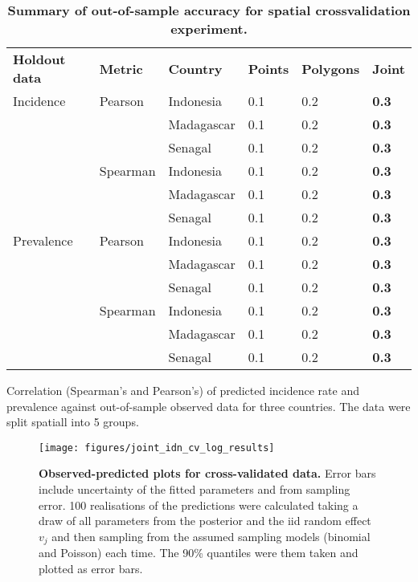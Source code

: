 \documentclass[10pt,letterpaper]{article}
\newlength\savedwidth
\newcommand\thickhline{\noalign{\global\savedwidth\arrayrulewidth\global\arrayrulewidth 2pt}%
\hline
\noalign{\global\arrayrulewidth\savedwidth}}
\begin{document}
\begin{table}[!ht]
\begin{adjustwidth}{-2.25in}{0in} %
\centering
\caption{
{\bf Summary of out-of-sample accuracy for spatial crossvalidation experiment.}}
\begin{tabular}{llllll}
\hline
{\bf Holdout data} & {\bf Metric} & {\bf Country} &  {\bf Points} & {\bf Polygons} & {\bf Joint} \\
\thickhline 
Incidence & Pearson & Indonesia & 0.1 & 0.2 & {\bf 0.3}\\
                   && Madagascar & 0.1 & 0.2 & {\bf 0.3}\\
                   && Senagal & 0.1 & 0.2 & {\bf 0.3}\vspace{1mm}\\ 
          & Spearman & Indonesia & 0.1 & 0.2 & {\bf 0.3}\\
                   && Madagascar & 0.1 & 0.2 & {\bf 0.3}\\
                   && Senagal & 0.1 & 0.2 & {\bf 0.3}\vspace{3mm} \\ 
Prevalence & Pearson & Indonesia & 0.1 & 0.2 & {\bf 0.3}\\
                   && Madagascar & 0.1 & 0.2 & {\bf 0.3}\\
                   && Senagal & 0.1 & 0.2 & {\bf 0.3}\vspace{1mm}\\ 
            & Spearman & Indonesia & 0.1 & 0.2 & {\bf 0.3}\\
                   && Madagascar & 0.1 & 0.2 & {\bf 0.3}\\
                   && Senagal & 0.1 & 0.2 & {\bf 0.3}\\
\end{tabular}
\begin{flushleft}
Correlation (Spearman's and Pearson's) of predicted incidence rate and prevalence against out-of-sample observed data for three countries.
The data were split spatiall into 5 groups.
\end{flushleft}
\label{table1}
\end{adjustwidth}
\end{table}





\begin{figure}[!h]
\texttt{[image: figures/joint\_idn\_cv\_log\_results]}
\caption{{\bf Observed-predicted plots for cross-validated data.}
Error bars include uncertainty of the fitted parameters and from sampling error.
100 realisations of the predictions were calculated taking a draw of all parameters from the posterior and the iid random effect $v_j$ and then sampling from the assumed sampling models (binomial and Poisson) each time.
The 90\% quantiles were them taken and plotted as error bars.
}
\label{predobsscatter}
\end{figure}
\end{document}
